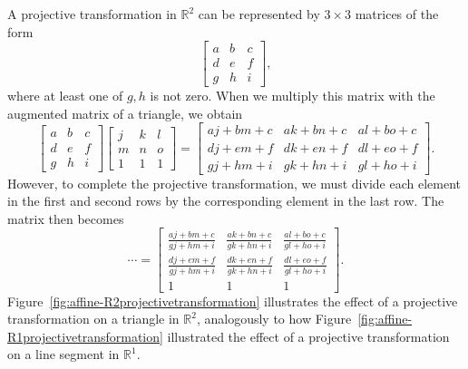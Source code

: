 A projective transformation in \(\mathbb{R}^{2}\) can be represented
by \(3\times3\) matrices of the form
\[
    \begin{bmatrix}
        a & b & c \\
        d & e & f \\
        g & h & i 
    \end{bmatrix},
\]
where at least one of \(g,h\) is not zero. When we multiply this matrix
with the augmented matrix of a triangle, we obtain
\[
    \begin{bmatrix}
        a & b & c \\
        d & e & f \\
        g & h & i 
    \end{bmatrix}
    \begin{bmatrix}
        j & k & l \\
        m & n & o \\
        1 & 1 & 1
    \end{bmatrix}
    =
    \begin{bmatrix}
        aj+bm+c & ak+bn+c & al+bo+c \\
        dj+em+f & dk+en+f & dl+eo+f \\
        gj+hm+i & gk+hn+i & gl+ho+i
    \end{bmatrix}.
\]
However, to complete the projective transformation, we must divide
each element in the first and second rows by the corresponding element 
in the last row. The matrix then becomes
\[
    \cdots =
    \begin{bmatrix}
        \frac{aj+bm+c}{gj+hm+i} & \frac{ak+bn+c}{gk+hn+i} & \frac{al+bo+c}{gl+ho+i} \\
        \frac{dj+em+f}{gj+hm+i} & \frac{dk+en+f}{gk+hn+i} & \frac{dl+eo+f}{gl+ho+i} \\
        1 & 1 & 1
    \end{bmatrix}.
\]
Figure~\ref{fig:affine-R2projectivetransformation} illustrates the 
effect of a projective transformation on a triangle in \(\mathbb{R}^{2}\), 
analogously to how Figure~\ref{fig:affine-R1projectivetransformation} 
illustrated the effect of a projective transformation on a line segment 
in \(\mathbb{R}^{1}\).

